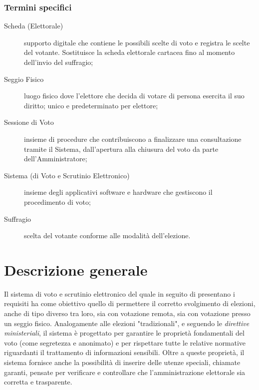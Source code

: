 \documentclass{report}
\begin{document}
\subsection{Termini specifici}
\begin{description}
	\item[Scheda (Elettorale)] supporto digitale che contiene le possibili scelte di voto e registra le scelte del votante. Sostituisce la scheda elettorale cartacea fino al momento dell'invio del suffragio;
	\item[Seggio Fisico] luogo fisico dove l'elettore che decida di votare di persona esercita il suo diritto; unico e predeterminato per elettore;
	\item[Sessione di Voto] insieme di procedure che contribuiscono a finalizzare una consultazione tramite il Sistema, dall'apertura alla chiusura del voto da parte dell'Amministratore;
	\item[Sistema (di Voto e Scrutinio Elettronico)] insieme degli applicativi software e hardware che gestiscono il procedimento di voto;
	\item[Suffragio] scelta del votante conforme alle modalità dell'elezione.
\end{description}



\chapter{Descrizione generale}
Il sistema di voto e scrutinio elettronico del quale in seguito di presentano i requisiti ha come obiettivo quello di permettere il corretto svolgimento di elezioni, anche di tipo diverso tra loro, sia con votazione remota, sia con votazione presso un seggio fisico.
Analogamente alle elezioni "tradizionali", e seguendo le \textit{direttive ministeriali},
il sistema è progettato per garantire le proprietà fondamentali del voto (come segretezza e anonimato) e per rispettare tutte le relative normative riguardanti il trattamento di informazioni sensibili. 
Oltre a queste proprietà, il sistema fornisce anche la possibilità di inserire delle utenze speciali, chiamate garanti, pensate per verificare e controllare che l'amministrazione elettorale sia corretta e trasparente. 
\par
\end{document}
